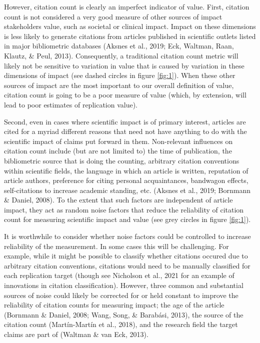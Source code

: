 \documentclass[
  english,
  jou,floatsintext]{apa6}
\begin{document}
However, citation count is clearly an imperfect indicator of value. First, citation count is not considered a very good measure of other sources of impact stakeholders value, such as societal or clinical impact. Impact on these dimensions is less likely to generate citations from articles published in scientific outlets listed in major bibliometric databases (Aksnes et al., 2019; Eck, Waltman, Raan, Klautz, \& Peul, 2013). Consequently, a traditional citation count metric will likely not be sensitive to variation in value that is caused by variation in these dimensions of impact (see dashed circles in figure \ref{fig:1}). When these other sources of impact are the most important to our overall definition of value, citation count is going to be a poor measure of value (which, by extension, will lead to poor estimates of replication value).

Second, even in cases where scientific impact is of primary interest, articles are cited for a myriad different reasons that need not have anything to do with the scientific impact of claims put forward in them. Non-relevant influences on citation count include (but are not limited to) the time of publication, the bibliometric source that is doing the counting, arbitrary citation conventions within scientific fields, the language in which an article is written, reputation of article authors, preference for citing personal acquaintances, bandwagon effects, self-citations to increase academic standing, etc. (Aksnes et al., 2019; Bornmann \& Daniel, 2008). To the extent that such factors are independent of article impact, they act as random noise factors that reduce the reliability of citation count for measuring scientific impact and value (see grey circles in figure \ref{fig:1}).

It is worthwhile to consider whether noise factors could be controlled to increase reliability of the measurement. In some cases this will be challenging. For example, while it might be possible to classify whether citations occured due to arbitrary citation conventions, citations would need to be manually classified for each replication target (though see Nicholson et al., 2021 for an example of innovations in citation classification). However, three common and substantial sources of noise could likely be corrected for or held constant to improve the reliability of citation counts for measuring impact; the age of the article (Bornmann \& Daniel, 2008; Wang, Song, \& Barabási, 2013), the source of the citation count (Martín-Martín et al., 2018), and the research field the target claims are part of (Waltman \& van Eck, 2013).
\end{document}
